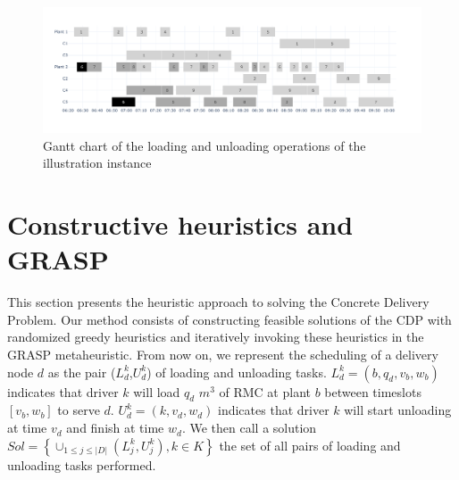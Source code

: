 \documentclass[authoryear,preprint,review,11pt]{elsarticle}
\begin{document}
{
\begin{table}[!ht]
    \centering
    \caption{Information of the illustration instance}
    \label{tab:instance_detail}
\end{table}
}
\begin{figure}[htb]
    \centering
    \caption{Gantt chart of the loading and unloading operations of the illustration instance}
    \label{fig:plants_schedules}
        \includegraphics[width=\linewidth]{gant_example.pdf}
\end{figure}

\section{Constructive heuristics and GRASP}
\label{sec:cdp_grasp_method}

This section presents the heuristic approach to solving the Concrete Delivery Problem. Our method consists of constructing feasible solutions of the CDP with randomized greedy heuristics and iteratively invoking these heuristics in the GRASP metaheuristic. From now on, we represent the scheduling of a delivery node $d$ as the pair ($L^k_{d}$,$U^k_{d}$) of loading and unloading tasks. $L^k_{d} = \left(b,q_d,v_b,w_b\right)$ indicates that driver $k$ will load $q_d$ $m^3$ of RMC at plant $b$ between timeslots $\left[v_b,w_b\right]$ to serve $d$. $U^k_{d} = \left(k,v_d, w_d\right)$ indicates that driver $k$ will start unloading at time $v_d$ and finish at time $w_d$. We then call a solution $Sol =\left\lbrace \cup _{1 \leq j \leq |D|} (L^k_{j}, U^k_{j}), k \in K \right\rbrace$ the set of all pairs of loading and unloading tasks performed.
\end{document}
